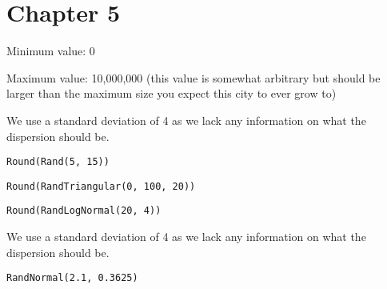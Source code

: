 \documentclass[]{memoir}
\begin{document}
\section{Chapter 5}


Minimum value: 0

Maximum value: 10,000,000 (this value is somewhat arbitrary but should
be larger than the maximum size you expect this city to ever grow to)


We use a standard deviation of 4 as we lack any information on what the
dispersion should be.

\lstinline!Round(Rand(5, 15))!


\lstinline!Round(RandTriangular(0, 100, 20))!


\lstinline!Round(RandLogNormal(20, 4))!

We use a standard deviation of 4 as we lack any information on what the
dispersion should be.


\lstinline!RandNormal(2.1, 0.3625)!

\end{document}
